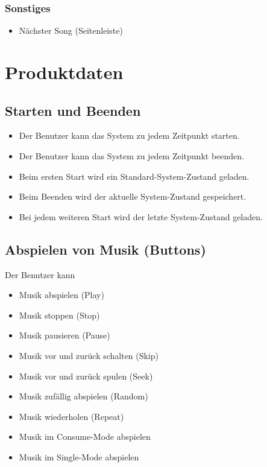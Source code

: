 \subsubsection{Sonstiges}
\begin{itemize}
    \item Nächster Song (Seitenleiste)
\end{itemize}

\section{Produktdaten}

\subsection{Starten und Beenden}
\begin{itemize}
    \item Der Benutzer kann das System zu jedem Zeitpunkt starten.
    \item Der Benutzer kann das System zu jedem Zeitpunkt beenden.
    \item Beim ersten Start wird ein Standard-System-Zustand geladen.
    \item Beim Beenden wird der aktuelle System-Zustand gespeichert.
    \item Bei jedem weiteren Start wird der letzte System-Zustand geladen.
\end{itemize}
\subsection{Abspielen von Musik (Buttons)}
Der Benutzer kann
\begin{itemize}
    \item Musik abspielen (Play)
    \item Musik stoppen (Stop)
    \item Musik pausieren (Pause)
    \item Musik vor und zurück schalten (Skip)
    \item Musik vor und zurück spulen (Seek)
    \item Musik zufällig abspielen (Random)
    \item Musik wiederholen (Repeat)
    \item Musik im Consume-Mode abspielen
    \item Musik im Single-Mode abspielen
\end{itemize}
